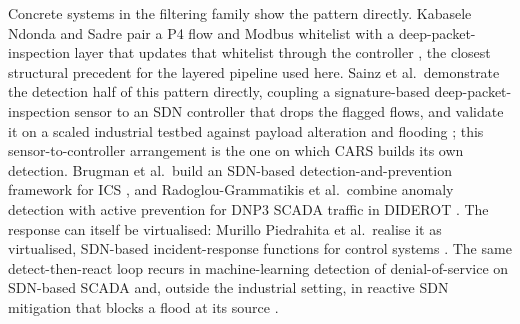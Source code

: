 Concrete systems in the filtering family show the pattern directly. Kabasele Ndonda and Sadre pair a P4 flow and Modbus whitelist with a deep-packet-inspection layer that updates that whitelist through the controller \cite{kabasele2018twolevel}, the closest structural precedent for the layered pipeline used here. Sainz et al.\ demonstrate the detection half of this pattern directly, coupling a signature-based deep-packet-inspection sensor to an SDN controller that drops the flagged flows, and validate it on a scaled industrial testbed against payload alteration and flooding \cite{sainz2020dpi}; this sensor-to-controller arrangement is the one on which CARS builds its own detection. Brugman et al.\ build an SDN-based detection-and-prevention framework for ICS \cite{brugman2019cloud}, and Radoglou-Grammatikis et al.\ combine anomaly detection with active prevention for DNP3 SCADA traffic in DIDEROT \cite{radoglou2020diderot}. The response can itself be virtualised: Murillo Piedrahita et al.\ realise it as virtualised, SDN-based incident-response functions for control systems \cite{murillo2018virf}. The same detect-then-react loop recurs in machine-learning detection of denial-of-service on SDN-based SCADA \cite{oyucu2024ensemble} and, outside the industrial setting, in reactive SDN mitigation that blocks a flood at its source \cite{manso2019ddos}.


